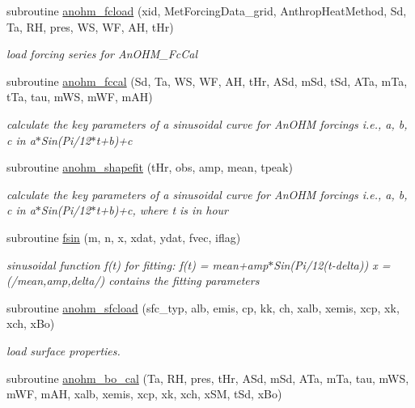 \begin{DoxyCompactItemize}
\item 
subroutine \hyperlink{namespaceanohm__module_ae189523211fd4b943a0e75cbc1e7b7d1}{anohm\+\_\+fcload} (xid, Met\+Forcing\+Data\+\_\+grid, Anthrop\+Heat\+Method, Sd, Ta, RH, pres, WS, WF, AH, t\+Hr)
\begin{DoxyCompactList}\small\item\em load forcing series for An\+O\+H\+M\+\_\+\+Fc\+Cal \end{DoxyCompactList}\item 
subroutine \hyperlink{namespaceanohm__module_afed396f8cec94d18f3c6bec4a2a879eb}{anohm\+\_\+fccal} (Sd, Ta, WS, WF, AH, t\+Hr, A\+Sd, m\+Sd, t\+Sd, A\+Ta, m\+Ta, t\+Ta, tau, m\+WS, m\+WF, m\+AH)
\begin{DoxyCompactList}\small\item\em calculate the key parameters of a sinusoidal curve for An\+O\+HM forcings i.\+e., a, b, c in a$\ast$\+Sin(Pi/12$\ast$t+b)+c \end{DoxyCompactList}\item 
subroutine \hyperlink{namespaceanohm__module_aec263fe8fda2e14111cd3f27a607cff0}{anohm\+\_\+shapefit} (t\+Hr, obs, amp, mean, tpeak)
\begin{DoxyCompactList}\small\item\em calculate the key parameters of a sinusoidal curve for An\+O\+HM forcings i.\+e., a, b, c in a$\ast$\+Sin(Pi/12$\ast$t+b)+c, where t is in hour \end{DoxyCompactList}\item 
subroutine \hyperlink{namespaceanohm__module_a8d56836cb99e49028266fac2beaf5b95}{fsin} (m, n, x, xdat, ydat, fvec, iflag)
\begin{DoxyCompactList}\small\item\em sinusoidal function f(t) for fitting\+: f(t) = mean+amp$\ast$\+Sin(Pi/12(t-\/delta)) x = (/mean,amp,delta/) contains the fitting parameters \end{DoxyCompactList}\item 
subroutine \hyperlink{namespaceanohm__module_aa417a23b56e0ed503452ac26f3de9886}{anohm\+\_\+sfcload} (sfc\+\_\+typ, alb, emis, cp, kk, ch, xalb, xemis, xcp, xk, xch, x\+Bo)
\begin{DoxyCompactList}\small\item\em load surface properties. \end{DoxyCompactList}\item 
subroutine \hyperlink{namespaceanohm__module_a7c747a2204089f0681ae47c92bf7d1e0}{anohm\+\_\+bo\+\_\+cal} (Ta, RH, pres, t\+Hr, A\+Sd, m\+Sd, A\+Ta, m\+Ta, tau, m\+WS, m\+WF, m\+AH, xalb, xemis, xcp, xk, xch, x\+SM, t\+Sd, x\+Bo)

\end{DoxyCompactItemize}
